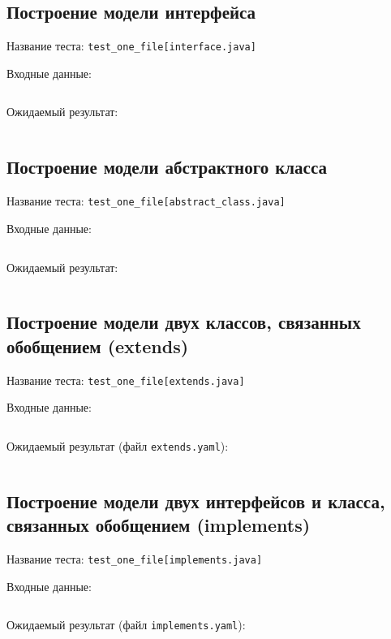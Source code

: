 \subsection*{Построение модели интерфейса}

Название теста: \verb;test_one_file[interface.java];

Входные данные:

\inputminted{java}{../src/test/data/src/interface.java}

Ожидаемый результат:

\inputminted{yaml}{../src/test/data/model/interface.yaml}

\subsection*{Построение модели абстрактного класса}

Название теста: \verb;test_one_file[abstract_class.java];

Входные данные:

\inputminted{java}{../src/test/data/src/abstract_class.java}

Ожидаемый результат:

\inputminted{yaml}{../src/test/data/model/abstract_class.yaml}

\subsection*{Построение модели двух классов, связанных обобщением (extends)}

Название теста: \verb;test_one_file[extends.java];

Входные данные:

\inputminted{java}{../src/test/data/src/extends.java}

Ожидаемый результат (файл \verb;extends.yaml;):

\inputminted{yaml}{../src/test/data/model/extends.yaml}

\subsection*{Построение модели двух интерфейсов и класса, связанных обобщением (implements)}

Название теста: \verb;test_one_file[implements.java];

Входные данные:

\inputminted{java}{../src/test/data/src/implements.java}

Ожидаемый результат (файл \verb;implements.yaml;):

